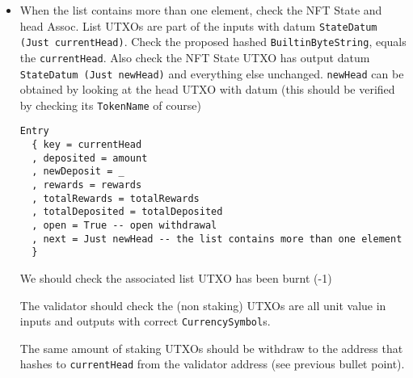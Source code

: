 \documentclass[10pt, a4paper]{article}
\theoremstyle{definition}
\begin{document}
\begin{enumerate}
{\begin{itemize}
{\begin{itemize}
\item{If \textbf{open} during \texttt{upp'userLength}, withdraw \texttt{amount} plus \\ $\texttt{withdrawRewards} = \texttt{rewards} + f * (\texttt{amount} - \texttt{newDeposit} + \texttt{rewards})* (1 + \texttt{upp'interest})^\texttt{upp'increments}$
(rewards for the last bonding cycle).}
\item{If \textbf{open} during \texttt{upp'bondingLength}, withdraw \texttt{amount} plus \\ $\texttt{withdrawRewards} = \texttt{rewards} + f * (\texttt{amount} + \texttt{rewards})* (1 + \texttt{upp'interest})^\texttt{k}$ for $1 \le k \le \texttt{upp'increments}$ (rewards for current incomplete bonding window).}
\end{itemize}

This all assumes the admin doesn't automatically distribute rewards upon closure. Here, $f$ is a user factor defined as $f := \frac{\texttt{deposited}}{\texttt{totalDeposited}} * \texttt{totalRewards}$. This is all verifiable on chain.
}

\item{
When the list contains more than one element, check the NFT State and head Assoc. List UTXOs are part of the inputs with datum \texttt{StateDatum (Just currentHead)}. Check the proposed hashed \texttt{BuiltinByteString}, equals the \texttt{currentHead}. Also check the NFT State UTXO has output datum \texttt{StateDatum (Just newHead)} and everything else unchanged. \texttt{newHead} can be obtained by looking at the head UTXO with datum (this should be verified by checking its \texttt{TokenName} of course)
\begin{verbatim}
Entry
  { key = currentHead
  , deposited = amount
  , newDeposit = _
  , rewards = rewards
  , totalRewards = totalRewards 
  , totalDeposited = totalDeposited
  , open = True -- open withdrawal
  , next = Just newHead -- the list contains more than one element
  }
\end{verbatim}


 We should check the associated list UTXO has been burnt (-1)

The validator should check the (non staking) UTXOs are all unit value in inputs and outputs with correct \texttt{CurrencySymbol}s.

The same amount of staking UTXOs should be withdraw to the address that hashes to \texttt{currentHead} from the validator address (see previous bullet point).
}

\end{itemize} 

}
\end{enumerate}
\end{document}
